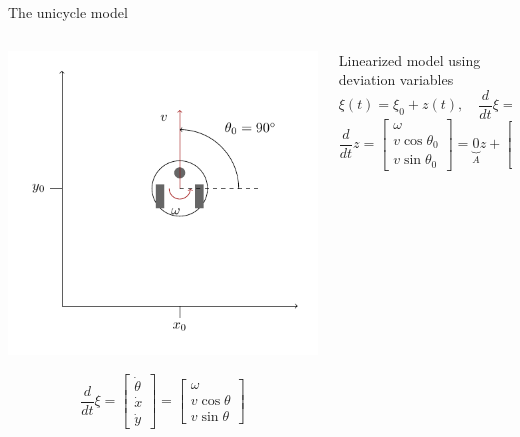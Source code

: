 \documentclass[presentation,aspectratio=169]{beamer}
\begin{document}
\begin{frame}[label={sec:orgc902816}]{The unicycle model}
\small 
\begin{columns}
\begin{column}{0.4\columnwidth}
\begin{center}
 \includegraphics[width=1.0\linewidth]{../figures/unicycle-model-op}
\end{center}

\[\frac{d}{dt} \xi = \begin{bmatrix} \dot{\theta}\\\dot{x}\\\dot{y} \end{bmatrix} = \begin{bmatrix} \omega\\ v\cos\theta\\v\sin\theta\end{bmatrix} \]
\end{column}
\begin{column}{0.6\columnwidth}
Linearized model using deviation variables
\[ \xi(t) = \xi_0 + z(t), \quad \frac{d}{dt} \xi = \frac{d}{dt} z\]
\[ \frac{d}{dt} z = \begin{bmatrix} \omega\\ v\cos\theta_0 \\ v\sin\theta_0 \end{bmatrix}
= \underbrace{0}_{A} z + \underbrace{\begin{bmatrix} 1 & 0 \\ 0 & 0\\ 0 & 1\end{bmatrix}}_{B} \begin{bmatrix}\omega\\v\end{bmatrix} \]


\end{column}
\end{columns}
\end{frame}
\end{document}
